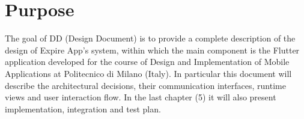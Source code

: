 \section{Purpose}
The goal of DD (Design Document) is to provide a complete description of the design of Expire App's system, within which the main component is the Flutter application developed for the course of Design and Implementation of Mobile Applications at Politecnico di Milano (Italy). In particular this document will describe the architectural decisions, their communication interfaces, runtime views and user interaction flow.
In the last chapter (5) it will also present implementation, integration and test plan.

